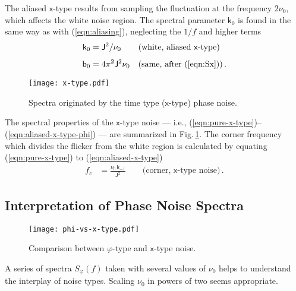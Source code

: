 \documentclass{article}
\newcommand{\req}[1]{(\ref{#1})}
\begin{document}
The aliased $\mathsf{x}$-type results from sampling the fluctuation at the frequency $2\nu_0$, which affects the white noise region.  The spectral parameter $\mathsf{k}_0$ is found in the same way as with \req{eqn:aliasing}, neglecting the $1/f$ and higher terms
\begin{align}
\label{eqn:aliased-x-type}
\mathsf{k}_0&=\mathsf{J}^2/\nu_0
&&\text{(white, aliased \textsf{x}-type)}\\[1ex]
\label{eqn:aliased-x-type-phi}
\mathsf{b}_0&=4\pi^2\mathsf{J}^2\nu_0
&&\text{(same, after \req{eqn:Sx})}\,.
\end{align}

\begin{figure}
\centering\texttt{[image: x-type.pdf]}
\caption{Spectra originated by the time type ($\mathsf{x}$-type) phase noise.}
\label{fig:x-type}
\end{figure}
The spectral properties of the $\mathsf{x}$-type noise --- i.e., \req{eqn:pure-x-type}--\req{eqn:aliased-x-type-phi} --- are summarized in Fig.\,\ref{fig:x-type}.
The corner frequency which divides the flicker from the white region is calculated by equating \req{eqn:pure-x-type} to \req{eqn:aliased-x-type} 
\begin{align}
\label{eqn:corner-x}
f_c&=\frac{\nu_0\,\mathsf{k}_{-1}}{\mathsf{J}^2}
\qquad\text{(corner, $\mathsf{x}$-type noise)}\,.
\end{align}






\subsection{Interpretation of Phase Noise Spectra}
\begin{figure}
\centering\texttt{[image: phi-vs-x-type.pdf]}
\caption{Comparison between $\varphi$-type and $\mathsf{x}$-type noise.}
\label{fig:phi-vs-x-type}
\end{figure}
A series of spectra $S_\varphi(f)$ taken with several values of $\nu_0$ helps to understand the interplay of noise types.
Scaling $\nu_0$ in powers of two seems appropriate.
\end{document}
